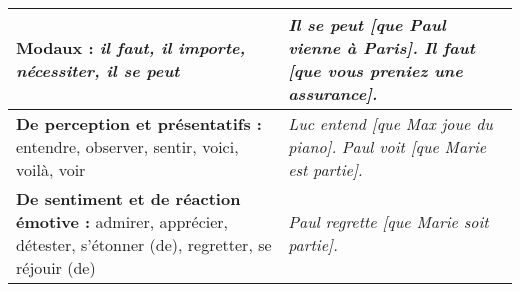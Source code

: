\documentclass[UTF8]{report}
\begin{document}
\begin{table}[H]
\begin{tabular}{|p{}|p{}|}
\textbf{Modaux :} \newline
\textit{il faut, il importe, nécessiter, il se peut}
&
\textit{Il se peut [que Paul vienne à Paris].} \newline
\textit{Il faut [que vous preniez une assurance].} \\
\hline

\textbf{De perception et présentatifs :} \newline
entendre, observer, sentir, voici, voilà, voir
&
\textit{Luc entend [que Max joue du piano].} \newline
\textit{Paul voit [que Marie est partie].} \\
\hline

\textbf{De sentiment et de réaction émotive :} \newline
admirer, apprécier, détester, s’étonner (de), regretter, se réjouir (de)
&
\textit{Paul regrette [que Marie soit partie].} \\
\hline
\end{tabular}
\end{table}
\end{document}
